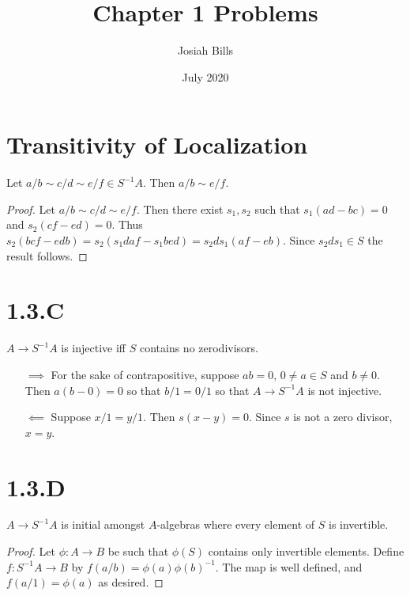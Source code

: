 \documentclass{article}
\title{Chapter 1 Problems}
\author{Josiah Bills}
\date{July 2020}
\begin{document}
\maketitle

\section{Transitivity of Localization}
\begin{theorem}
    Let $a/b \sim c/d \sim e/f \in S^{-1}A$. Then $a/b \sim e/f$.
\end{theorem}
\begin{proof}
    Let $a/b \sim c/d \sim e/f$. Then there exist $s_1, s_2$ such that
    $s_1(ad-bc)=0$ and $s_2(cf-ed)=0$. Thus $s_2(bcf-edb)=s_2(s_1daf-s_1bed)=s_2ds_1(af-eb)$.
    Since $s_2ds_1 \in S$ the result follows.
\end{proof}

\section{1.3.C}
\begin{theorem}
    $A \to S^{-1}A$ is injective iff $S$ contains no
    zerodivisors.
\end{theorem}
\begin{theorem}
    \begin{itemize}
        \item[$\implies$] For the sake of contrapositive, suppose $ab=0$,
            $0 \neq a \in S$ and $b \neq 0$. Then $a(b-0)=0$
            so that $b/1=0/1$ so that $A \to S^{-1}A$ is not injective.
        \item[$\impliedby$] Suppose $x/1=y/1$. Then $s(x-y)=0$. Since
            $s$ is not a zero divisor, $x=y$.
    \end{itemize}
\end{theorem}

\section{1.3.D}
\begin{theorem}
    $A \to S^{-1}A$ is initial amongst $A$-algebras where
    every element of $S$ is invertible.
\end{theorem}
\begin{proof}
    Let $\phi: A \to B$ be such that $\phi(S)$ contains only
    invertible elements. Define $f : S^{-1}A \to B$ by $f(a/b)=\phi(a)\phi(b)^{-1}$.
    The map is well defined, and $f(a/1)=\phi(a)$ as desired.
\end{proof}
\end{document}
